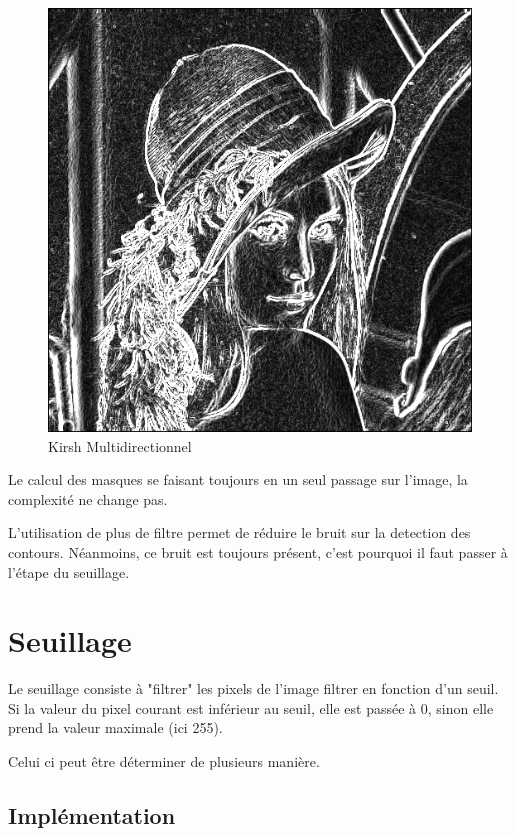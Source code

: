 \documentclass[11pt]{article}
\begin{document}
	\begin{figure}[H]
		\centering
		\includegraphics[scale=0.25]{Image/filtreKirshMultidirectionnel.png}
		\caption{Kirsh Multidirectionnel}
		\label{fig:KirshMultidirectionnel}
	\end{figure}

	Le calcul des masques se faisant toujours en un seul passage sur l'image, la complexité ne change pas.

	L'utilisation de plus de filtre permet de réduire le bruit sur la detection des contours. 
	Néanmoins, ce bruit est toujours présent, c'est pourquoi il faut passer à l'étape du seuillage.
 
\section{Seuillage}
	
	Le seuillage consiste à "filtrer" les pixels de l'image filtrer en fonction d'un seuil. 
	Si la valeur du pixel courant est inférieur au seuil, elle est passée à 0, sinon elle prend la valeur maximale (ici 255).

	Celui ci peut être déterminer de plusieurs manière.

	\subsection{Implémentation}
\end{document}

